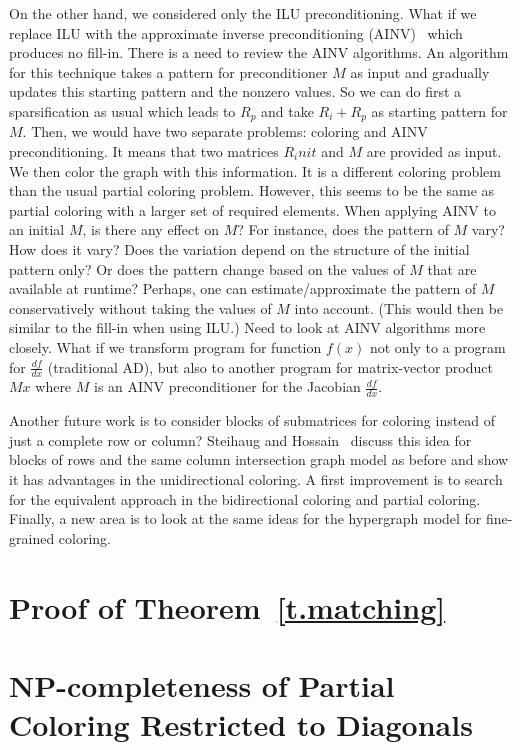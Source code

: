 \documentclass[12pt, twoside]{book}
\begin{document}
On the other hand, we considered only the ILU preconditioning. What if we replace ILU with the approximate inverse preconditioning (AINV)~\cite{ainv98} which produces no fill-in. There is a need to review the AINV algorithms. An algorithm for this technique takes a pattern for preconditioner $M$ as input and gradually updates this starting pattern and the nonzero values.
So we can do first a sparsification as usual which leads to $R_p$ and take $R_i + R_p$ as starting pattern for $M$. Then, we would have two
separate problems: coloring and AINV preconditioning. It means that two matrices $R_init$ and $M$ are provided as input. We then color the graph with this information. It is a different coloring problem than the usual partial coloring problem. However, this seems to be the same as partial coloring with a larger set of required elements.
When applying AINV to an initial $M$, is there any effect on $M$? For
instance, does the pattern of $M$ vary? How does it vary? Does the
variation depend on the structure of the initial pattern only? Or
does the pattern change based on the values of $M$ that are available
at runtime? Perhaps, one can estimate/approximate the pattern of $M$
conservatively without taking the values of $M$ into account. (This
would then be similar to the fill-in when using ILU.) Need to look
at AINV algorithms more closely.
What if we transform program for function $f(x)$ not only to a program for $\frac{df}{dx}$ (traditional AD), but also to another program for matrix-vector product $Mx$ where $M$ is an AINV preconditioner for the Jacobian $\frac{df}{dx}$.

Another future work is to consider blocks of submatrices for coloring instead of just a complete row or column? Steihaug and Hossain~\cite{Steihaug1997GCa} discuss this idea for blocks of rows and the same column intersection graph model as before and show it has advantages in the unidirectional coloring. A first improvement is to search for the equivalent approach in the bidirectional coloring and partial coloring. Finally, a new area is to look at the same ideas for the hypergraph model for fine-grained coloring.



\appendix
\chapter{Proof of Theorem~\ref{t.matching}}
\label{app.proof.1}

\chapter{NP-completeness of Partial Coloring Restricted to Diagonals}
\label{app.npcomp}
\cite{np-complet-graph-coloring}
\end{document}
